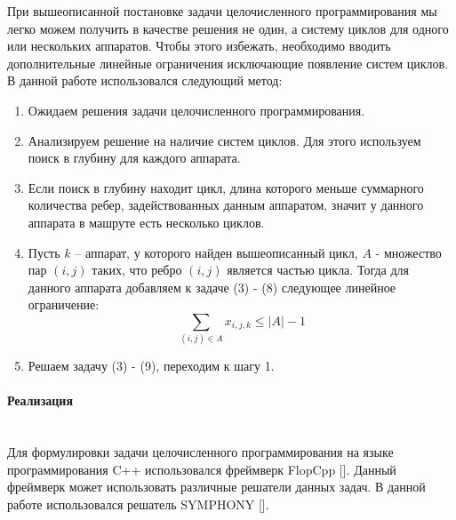 \documentclass[a4paper,14pt,russian]{article}
\begin{document}
При вышеописанной постановке задачи целочисленного программирования мы легко можем получить в качестве решения не один, а систему циклов для одного или нескольких аппаратов. Чтобы этого избежать, необходимо вводить дополнительные линейные ограничения исключающие появление систем циклов. В данной работе использовался следующий метод:
\begin{enumerate}
\item  Ожидаем решения задачи целочисленного программирования.
\item Анализируем решение на наличие систем циклов. Для этого используем поиск в глубину для каждого аппарата.
\item Если поиск в глубину находит цикл, длина которого меньше суммарного количества ребер, задействованных данным аппаратом, значит у данного аппарата в машруте есть несколько циклов.
\item Пусть $k$ -- аппарат, у которого найден вышеописанный цикл, $A$ - множество пар $(i, j)$ таких, что ребро $(i, j)$ является частью цикла. Тогда для данного аппарата добавляем к задаче (3) - (8) следующее линейное ограничение:
\begin{equation}
\displaystyle \sum_{(i,j) \in A} x_{i,j,k} \le |A| - 1
\end{equation}

\item Решаем задачу (3) - (9), переходим к шагу 1.
\end{enumerate}


\paragraph{Реализация} ~\\
Для формулировки задачи целочисленного программирования на языке программирования C++ использовался фреймверк FlopCpp []. Данный фреймверк может использовать различные решатели данных задач. В данной работе использовался решатель SYMPHONY [].


\end{document}
